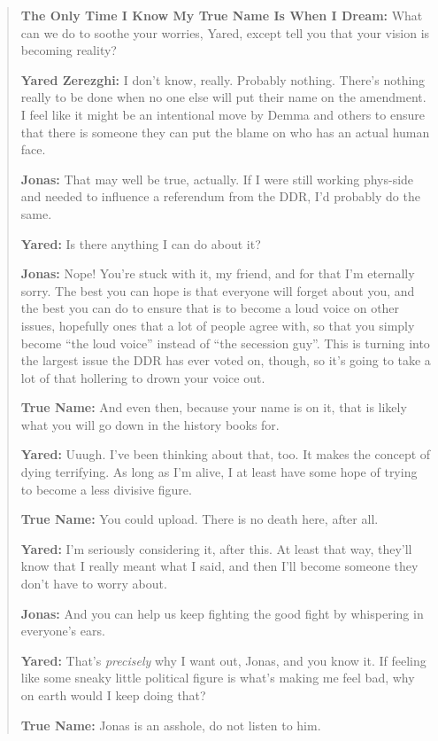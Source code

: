 \begin{quote}
\textbf{The Only Time I Know My True Name Is When I Dream:} What can we do to soothe your worries, Yared, except tell you that your vision is becoming reality?

\textbf{Yared Zerezghi:} I don't know, really. Probably nothing. There's nothing really to be done when no one else will put their name on the amendment. I feel like it might be an intentional move by Demma and others to ensure that there is someone they can put the blame on who has an actual human face.

\textbf{Jonas:} That may well be true, actually. If I were still working phys-side and needed to influence a referendum from the DDR, I'd probably do the same.

\textbf{Yared:} Is there anything I can do about it?

\textbf{Jonas:} Nope! You're stuck with it, my friend, and for that I'm eternally sorry. The best you can hope is that everyone will forget about you, and the best you can do to ensure that is to become a loud voice on other issues, hopefully ones that a lot of people agree with, so that you simply become ``the loud voice'' instead of ``the secession guy''. This is turning into the largest issue the DDR has ever voted on, though, so it's going to take a lot of that hollering to drown your voice out.

\textbf{True Name:} And even then, because your name is on it, that is likely what you will go down in the history books for.

\textbf{Yared:} Uuugh. I've been thinking about that, too. It makes the concept of dying terrifying. As long as I'm alive, I at least have some hope of trying to become a less divisive figure.

\textbf{True Name:} You could upload. There is no death here, after all.

\textbf{Yared:} I'm seriously considering it, after this. At least that way, they'll know that I really meant what I said, and then I'll become someone they don't have to worry about.

\textbf{Jonas:} And you can help us keep fighting the good fight by whispering in everyone's ears.

\textbf{Yared:} That's \emph{precisely} why I want out, Jonas, and you know it. If feeling like some sneaky little political figure is what's making me feel bad, why on earth would I keep doing that?

\textbf{True Name:} Jonas is an asshole, do not listen to him.


\end{quote}
